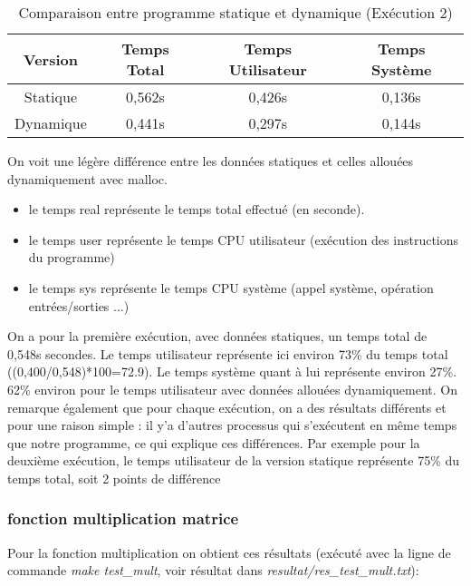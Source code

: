 \documentclass{rapport}
\begin{document}
\begin{table}[h!]
    \centering
    \begin{tabular}{|c|c|c|c|}
        \hline
        Version & Temps Total & Temps Utilisateur & Temps Système \\
        \hline
        Statique & 0,562s & 0,426s & 0,136s \\
        \hline
        Dynamique & 0,441s & 0,297s & 0,144s \\
        \hline
    \end{tabular}
    \caption{Comparaison entre programme statique et dynamique (Exécution 2)}
    \label{tab:graph_characteristics_2}
\end{table}
  
  On voit une légère différence entre les données statiques et celles allouées dynamiquement avec malloc.
  \begin{itemize}
        \item le temps real représente le temps total effectué (en seconde).
    \end{itemize}
    \begin{itemize}
        \item le temps user représente le temps CPU utilisateur (exécution des instructions du programme)
    \end{itemize}
    \begin{itemize}
        \item le temps sys représente le temps CPU système (appel système, opération entrées/sorties ...)
    \end{itemize}\textit{}
    On a pour la première exécution, avec données statiques, un temps total de 0,548s secondes. Le temps utilisateur représente ici environ 73\% du temps total ((0,400/0,548)*100=72.9). Le temps système quant à lui représente environ 27\%.
    62\% environ pour le temps utilisateur avec données allouées dynamiquement.
    \newline
  \indent On remarque également que pour chaque exécution, on a des résultats différents et pour une raison simple : il y'a d'autres processus qui s'exécutent en même temps que notre programme, ce qui explique ces différences. Par exemple pour la deuxième exécution, le temps utilisateur de la version statique représente 75\% du temps total, soit 2 points de différence
 \subsubsection{fonction multiplication matrice}
  Pour la fonction multiplication on obtient ces résultats (exécuté avec la ligne de commande \textit{make test\_mult}, voir résultat dans \textit{resultat/res\_test\_mult.txt}):
\end{document}
